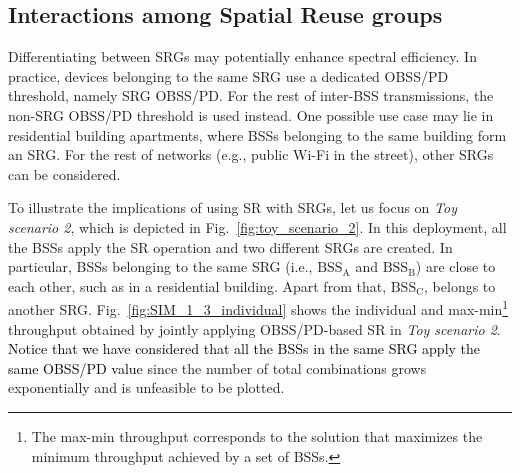 \documentclass{ieeeaccess}
\begin{document}
\subsection{Interactions among Spatial Reuse groups}
\label{section:advanced_interactions}
Differentiating between SRGs may potentially enhance spectral efficiency. In practice, devices belonging to the same SRG use a dedicated OBSS/PD threshold, namely SRG OBSS/PD. For the rest of inter-BSS transmissions, the non-SRG OBSS/PD threshold is used instead. One possible use case may lie in residential building apartments, where BSSs belonging to the same building form an SRG. For the rest of networks (e.g., public Wi-Fi in the street), other SRGs can be considered. 

To illustrate the implications of using SR with SRGs, let us focus on \emph{Toy scenario 2}, which is depicted in Fig.~\ref{fig:toy_scenario_2}. In this deployment, all the BSSs apply the SR operation and two different SRGs are created. In particular, BSSs belonging to the same SRG (i.e., $\text{BSS}_\text{A}$ and $\text{BSS}_\text{B}$) are close to each other, such as in a residential building. Apart from that, $\text{BSS}_\text{C}$, belongs to another SRG. Fig.~\ref{fig:SIM_1_3_individual} shows the individual and max-min\footnote{The max-min throughput corresponds to the solution that maximizes the minimum throughput achieved by a set of BSSs.} throughput obtained by jointly applying OBSS/PD-based SR in \emph{Toy scenario 2}. \textcolor{black}{Notice that we have considered that all the BSSs in the same SRG apply the same OBSS/PD value} since the number of total combinations grows exponentially and is unfeasible to be plotted. 
\end{document}

